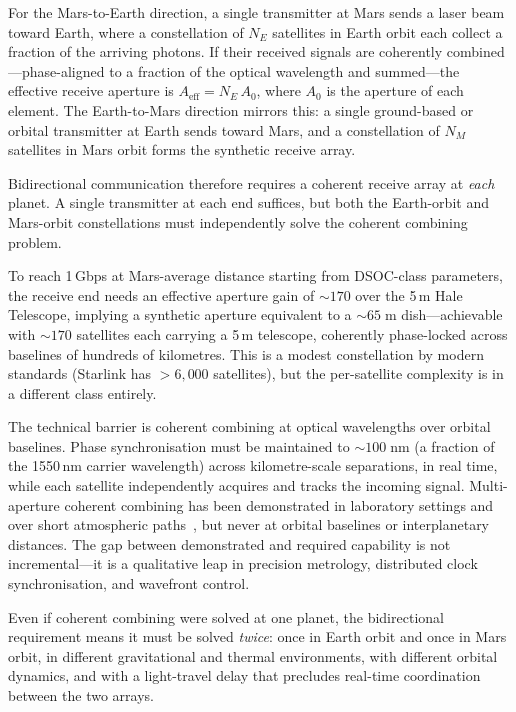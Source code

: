 For the Mars-to-Earth direction, a single transmitter at Mars sends a laser
beam toward Earth, where a constellation of $N_E$ satellites in Earth orbit
each collect a fraction of the arriving photons. If their received signals are
coherently combined---phase-aligned to a fraction of the optical wavelength and
summed---the effective receive aperture is $A_{\text{eff}} = N_E \, A_0$, where
$A_0$ is the aperture of each element. The Earth-to-Mars direction mirrors this:
a single ground-based or orbital transmitter at Earth sends toward Mars, and a
constellation of $N_M$ satellites in Mars orbit forms the synthetic receive
array.

Bidirectional communication therefore requires a coherent receive array at
\emph{each} planet. A single transmitter at each end suffices, but both the
Earth-orbit and Mars-orbit constellations must independently solve the coherent
combining problem.

To reach 1\,Gbps at Mars-average distance starting from DSOC-class parameters,
the receive end needs an effective aperture gain of $\sim\!170$ over the 5\,m
Hale Telescope, implying a synthetic aperture equivalent to a
$\sim\!65\;\text{m}$ dish---achievable with $\sim\!170$ satellites each carrying
a 5\,m telescope, coherently phase-locked across baselines of hundreds of
kilometres. This is a modest constellation by modern standards (Starlink has
$> 6{,}000$ satellites), but the per-satellite complexity is in a different
class entirely.

The technical barrier is coherent combining at optical wavelengths over orbital
baselines. Phase synchronisation must be maintained to $\sim\!100\;\text{nm}$
(a fraction of the 1550\,nm carrier wavelength) across kilometre-scale
separations, in real time, while each satellite independently acquires and
tracks the incoming signal. Multi-aperture coherent combining has been
demonstrated in laboratory settings and over short atmospheric
paths~\cite{coherent-combining2016}, but never at orbital baselines or
interplanetary distances. The gap between demonstrated and required capability
is not incremental---it is a qualitative leap in precision metrology,
distributed clock synchronisation, and wavefront control.

Even if coherent combining were solved at one planet, the bidirectional
requirement means it must be solved \emph{twice}: once in Earth orbit and once
in Mars orbit, in different gravitational and thermal environments, with
different orbital dynamics, and with a light-travel delay that precludes
real-time coordination between the two arrays.

